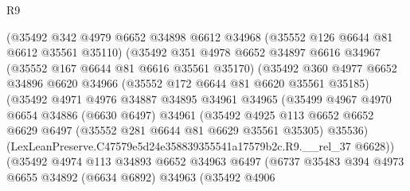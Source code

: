 \begin{lexlean}{R9}
\begin{coremodule}
                      (@35492
                        @342
                        @4979
                        @6652
                        @34898
                        @6612
                        @34968
                        (@35552 @126 @6644 @81 @6612 @35561 @35110)
                        (@35492
                          @351
                          @4978
                          @6652
                          @34897
                          @6616
                          @34967
                          (@35552 @167 @6644 @81 @6616 @35561 @35170)
                          (@35492
                            @360
                            @4977
                            @6652
                            @34896
                            @6620
                            @34966
                            (@35552 @172 @6644 @81 @6620 @35561 @35185)
                            (@35492
                              @4971
                              @4976
                              @34887
                              @34895
                              @34961
                              @34965
                              (@35499
                                @4967
                                @4970
                                @6654
                                @34886
                                (@6630 @6497)
                                @34961
                                (@35492
                                  @4925
                                  @113
                                  @6652
                                  @6652
                                  @6629
                                  @6497
                                  (@35552 @281 @6644 @81 @6629 @35561 @35305)
                                  @35536)
                                (LexLeanPreserve.C47579e5d24e358839355541a17579b2c.R9.__rel_37
                                  @6628))
                              (@35492
                                @4974
                                @113
                                @34893
                                @6652
                                @34963
                                @6497
                                (@6737
                                  @35483
                                  @394
                                  @4973
                                  @6655
                                  @34892
                                  (@6634 @6892)
                                  @34963
                                  (@35492
                                    @4906

\end{coremodule}
\end{lexlean}
